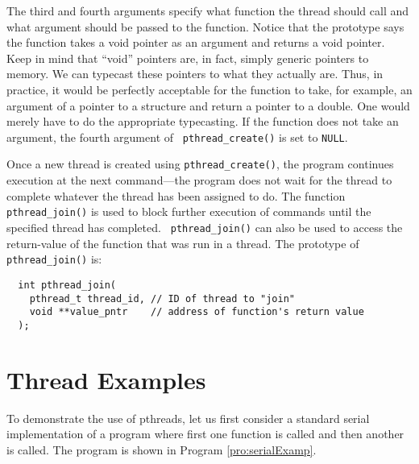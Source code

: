 The third and fourth arguments specify what function the thread should
call and what argument should be passed to the function.  Notice that
the prototype says the function takes a void pointer as an argument
and returns a void pointer.  Keep in mind that ``void'' pointers are,
in fact, simply generic pointers to memory.  We can typecast these
pointers to what they actually are.  Thus, in practice, it would be
perfectly acceptable for the function to take, for example, an
argument of a pointer to a structure and return a pointer to a double.
One would merely have to do the appropriate typecasting.  If the
function does not take an argument, the fourth argument of {\tt
  pthread\_create()} is set to {\tt NULL}.

Once a new thread is created using {\tt pthread\_create()}, the
program continues execution at the next command---the program does not
wait for the thread to complete whatever the thread has been assigned
to do.  The function {\tt pthread\_join()} is used to block further
execution of commands until the specified thread has completed.  {\tt
pthread\_join()} can also be used to access the return-value of the
function that was run in a thread.  The prototype of {\tt
pthread\_join()} is:
\begin{lstlisting}
  int pthread_join(
    pthread_t thread_id, // ID of thread to "join"
    void **value_pntr    // address of function's return value
  );
\end{lstlisting}


\section{Thread Examples}

To demonstrate the use of pthreads, let us first consider a standard
serial implementation of a program where first one function is called
and then another is called.  The program is shown in Program
\ref{pro:serialExamp}.

